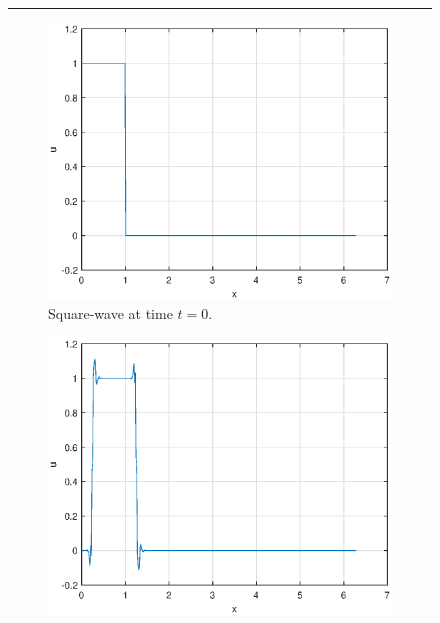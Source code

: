 \documentclass[a4paper, 12pt]{article}
\begin{document}
\begin{figure}[H]
\begin{center}
\rule{\linewidth}{.4pt}
\end{center}
\begin{subfigure}[b]{0.5\textwidth}
\includegraphics[width=\textwidth]{Q2t=0}\hfill
\caption{Square-wave at time $t=0$.}%
\end{subfigure}
\begin{subfigure}[b]{0.5\textwidth}
\includegraphics[width=\textwidth]{Q2t=0.25}\hfill

\end{subfigure}
\end{figure}
\end{document}
